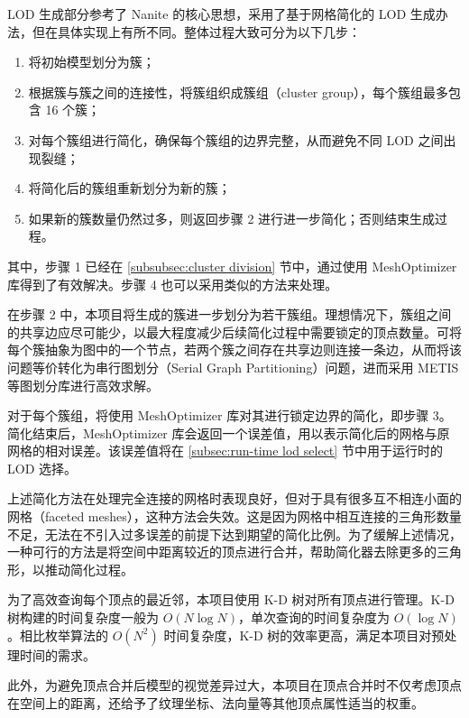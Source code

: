 LOD 生成部分参考了 Nanite 的核心思想，采用了基于网格简化的 LOD 生成办法\cite{Jensen2023}，但在具体实现上有所不同。整体过程大致可分为以下几步\cite{Xavier2024}：

\newcommand{\stepref}[1]{\textbf{Step~\ref{#1}}}

\begin{enumerate}
    \item 将初始模型划分为簇；
    \item 根据簇与簇之间的连接性，将簇组织成簇组（cluster group），每个簇组最多包含 16 个簇；
    \item 对每个簇组进行简化，确保每个簇组的边界完整，从而避免不同 LOD 之间出现裂缝；
    \item 将简化后的簇组重新划分为新的簇；
    \item 如果新的簇数量仍然过多，则返回步骤 2 进行进一步简化；否则结束生成过程。
\end{enumerate}

其中，步骤 1 已经在 \ref{subsubsec:cluster division} 节中，通过使用 MeshOptimizer 库得到了有效解决。步骤 4 也可以采用类似的方法来处理。

在步骤 2 中，本项目将生成的簇进一步划分为若干簇组。理想情况下，簇组之间的共享边应尽可能少，以最大程度减少后续简化过程中需要锁定的顶点数量。可将每个簇抽象为图中的一个节点，若两个簇之间存在共享边则连接一条边，从而将该问题等价转化为串行图划分（Serial Graph Partitioning）问题，进而采用 METIS 等图划分库进行高效求解\cite{METIS}。

对于每个簇组，将使用 MeshOptimizer 库对其进行锁定边界的简化，即步骤 3。简化结束后，MeshOptimizer 库会返回一个误差值，用以表示简化后的网格与原网格的相对误差。该误差值将在 \ref{subsec:run-time lod select} 节中用于运行时的 LOD 选择。

上述简化方法在处理完全连接的网格时表现良好，但对于具有很多互不相连小面的网格（faceted meshes），这种方法会失效。这是因为网格中相互连接的三角形数量不足，无法在不引入过多误差的前提下达到期望的简化比例。为了缓解上述情况，一种可行的方法是将空间中距离较近的顶点进行合并，帮助简化器去除更多的三角形，以推动简化过程。

为了高效查询每个顶点的最近邻，本项目使用 K-D 树对所有顶点进行管理\cite{bentley1975}。K-D 树构建的时间复杂度一般为 $O(N\log N)$，单次查询的时间复杂度为 $O(\log N)$。相比枚举算法的 $O(N^2)$ 时间复杂度，K-D 树的效率更高，满足本项目对预处理时间的需求。

此外，为避免顶点合并后模型的视觉差异过大，本项目在顶点合并时不仅考虑顶点在空间上的距离，还给予了纹理坐标、法向量等其他顶点属性适当的权重。


